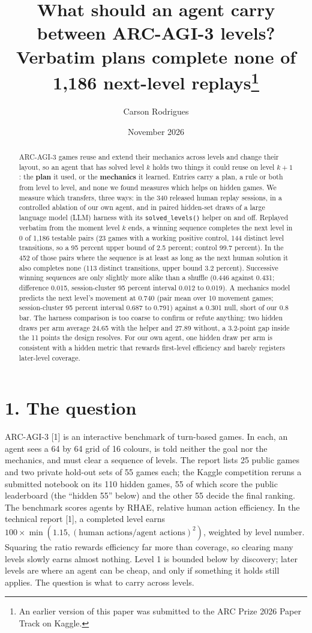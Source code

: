 \documentclass[
  11pt,
]{article}
\title{What should an agent carry between ARC-AGI-3 levels? Verbatim
plans complete none of 1,186 next-level replays\thanks{An earlier
version of this paper was submitted to the ARC Prize 2026 Paper Track on
Kaggle.}}
\author{Carson Rodrigues}
\date{November 2026}
\newcounter{none} %
\begin{document}
\maketitle
\begin{abstract}
ARC-AGI-3 games reuse and extend their mechanics across levels and
change their layout, so an agent that has solved level \(k\) holds two
things it could reuse on level \(k{+}1\): the \textbf{plan} it used, or
the \textbf{mechanics} it learned. Entries carry a plan, a rule or both
from level to level, and none we found measures which helps on hidden
games. We measure which transfers, three ways: in the 340 released human
replay sessions, in a controlled ablation of our own agent, and in
paired hidden-set draws of a large language model (LLM) harness with its
\texttt{solved\_levels()} helper on and off. Replayed verbatim from the
moment level \(k\) ends, a winning sequence completes the next level in
0 of 1,186 testable pairs (23 games with a working positive control, 144
distinct level transitions, so a 95 percent upper bound of 2.5 percent;
control 99.7 percent). In the 452 of those pairs where the sequence is
at least as long as the next human solution it also completes none (113
distinct transitions, upper bound 3.2 percent). Successive winning
sequences are only slightly more alike than a shuffle (0.446 against
0.431; difference 0.015, session-cluster 95 percent interval 0.012 to
0.019). A mechanics model predicts the next level's movement at 0.740
(pair mean over 10 movement games; session-cluster 95 percent interval
0.687 to 0.791) against a 0.301 null, short of our 0.8 bar. The harness
comparison is too coarse to confirm or refute anything: two hidden draws
per arm average 24.65 with the helper and 27.89 without, a 3.2-point gap
inside the 11 points the design resolves. For our own agent, one hidden
draw per arm is consistent with a hidden metric that rewards first-level
efficiency and barely registers later-level coverage.
\end{abstract}

\section{1. The question}\label{the-question}

ARC-AGI-3 {[}1{]} is an interactive benchmark of turn-based games. In
each, an agent sees a 64 by 64 grid of 16 colours, is told neither the
goal nor the mechanics, and must clear a sequence of levels. The report
lists 25 public games and two private hold-out sets of 55 games each;
the Kaggle competition reruns a submitted notebook on its 110 hidden
games, 55 of which score the public leaderboard (the ``hidden 55''
below) and the other 55 decide the final ranking. The benchmark scores
agents by RHAE, relative human action efficiency. In the technical
report {[}1{]}, a completed level earns
\(100 \times \min(1.15, (\text{human actions} / \text{agent actions})^2)\),
weighted by level number. Squaring the ratio rewards efficiency far more
than coverage, so clearing many levels slowly earns almost nothing.
Level 1 is bounded below by discovery; later levels are where an agent
can be cheap, and only if something it holds still applies. The question
is what to carry across levels.
\end{document}
